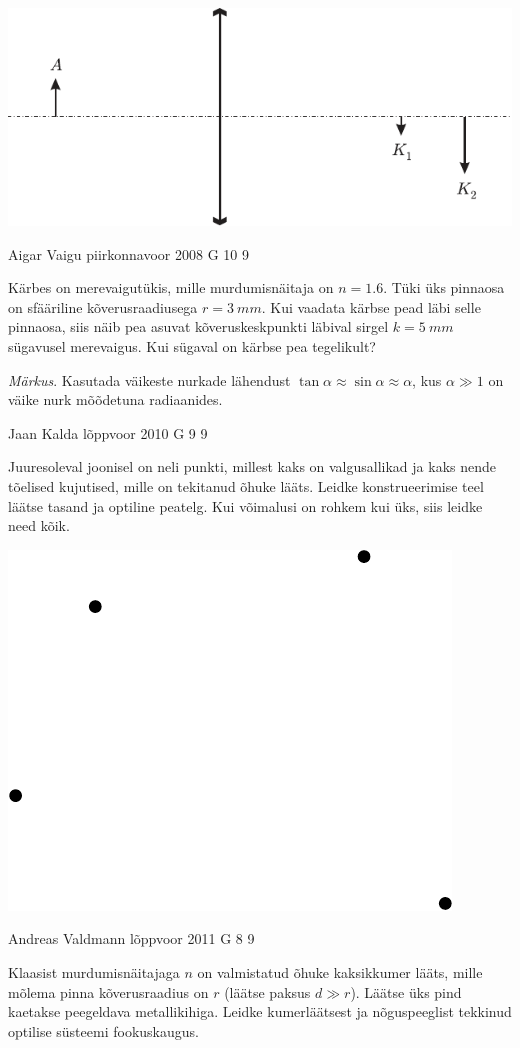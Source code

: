 \documentclass[11pt]{article}
\begin{document}
{{\begin{center}
	\includegraphics[width=\linewidth]{2007-v3g-09-yl}
\end{center}
\fi
}

{Aigar Vaigu} %
{piirkonnavoor} %
{2008} %
{G 10} %
{9} %
{
\ifStatement
Kärbes on merevaigutükis, mille murdumisnäitaja on $n=\num{1,6}$. Tüki üks pinnaosa on sfääriline kõverusraadiusega $r = \SI{3}{mm}$. Kui vaadata kärbse pead läbi selle pinnaosa, siis näib pea asuvat kõveruskeskpunkti läbival sirgel $k = \SI{5}{mm}$ sügavusel merevaigus. Kui sügaval on kärbse pea tegelikult? 

\emph{Märkus}. Kasutada väikeste nurkade lähendust $\tan \alpha \approx \sin \alpha \approx \alpha$, kus $\alpha \gg 1$ on väike nurk mõõdetuna radiaanides.
\fi
}

{Jaan Kalda} %
{lõppvoor} %
{2010} %
{G 9} %
{9} %
{
\ifStatement
Juuresoleval joonisel on neli punkti, millest kaks on valgusallikad ja kaks nende tõelised kujutised, mille on tekitanud õhuke lääts. Leidke konstrueerimise teel läätse tasand ja optiline peatelg. Kui võimalusi on rohkem kui üks, siis leidke need kõik.

\begin{center}
	\includegraphics[width=0.3\linewidth]{2010-v3g-09-punktid}
\end{center}
\fi
}

{Andreas Valdmann} %
{lõppvoor} %
{2011} %
{G 8} %
{9} %
{
\ifStatement
Klaasist murdumisnäitajaga $n$ on valmistatud õhuke kaksikkumer lääts, mille mõlema pinna kõverusraadius on $r$ (läätse paksus
$d \gg r$). Läätse üks pind kaetakse peegeldava metallikihiga. Leidke kumerläätsest ja nõguspeeglist tekkinud optilise süsteemi fookuskaugus. 

}}
\end{document}
